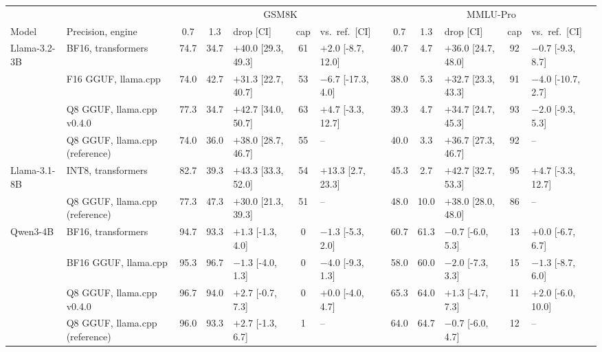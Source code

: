 \begin{tabular}{llcclclcclcl}
\toprule
 & & \multicolumn{5}{c}{GSM8K} & \multicolumn{5}{c}{MMLU-Pro} \\
Model & Precision, engine & 0.7 & 1.3 & drop [CI] & cap & vs.\ ref.\ [CI] & 0.7 & 1.3 & drop [CI] & cap & vs.\ ref.\ [CI] \\
\midrule
Llama-3.2-3B & BF16, transformers & 74.7 & 34.7 & $+40.0$ [29.3, 49.3] & 61 & $+2.0$ [-8.7, 12.0] & 40.7 & 4.7 & $+36.0$ [24.7, 48.0] & 92 & $-0.7$ [-9.3, 8.7] \\
 & F16 GGUF, llama.cpp & 74.0 & 42.7 & $+31.3$ [22.7, 40.7] & 53 & $-6.7$ [-17.3, 4.0] & 38.0 & 5.3 & $+32.7$ [23.3, 43.3] & 91 & $-4.0$ [-10.7, 2.7] \\
 & Q8 GGUF, llama.cpp v0.4.0 & 77.3 & 34.7 & $+42.7$ [34.0, 50.7] & 63 & $+4.7$ [-3.3, 12.7] & 39.3 & 4.7 & $+34.7$ [24.7, 45.3] & 93 & $-2.0$ [-9.3, 5.3] \\
 & Q8 GGUF, llama.cpp (reference) & 74.0 & 36.0 & $+38.0$ [28.7, 46.7] & 55 & -- & 40.0 & 3.3 & $+36.7$ [27.3, 46.7] & 92 & -- \\
\midrule
Llama-3.1-8B & INT8, transformers & 82.7 & 39.3 & $+43.3$ [33.3, 52.0] & 54 & $+13.3$ [2.7, 23.3] & 45.3 & 2.7 & $+42.7$ [32.7, 53.3] & 95 & $+4.7$ [-3.3, 12.7] \\
 & Q8 GGUF, llama.cpp (reference) & 77.3 & 47.3 & $+30.0$ [21.3, 39.3] & 51 & -- & 48.0 & 10.0 & $+38.0$ [28.0, 48.0] & 86 & -- \\
\midrule
Qwen3-4B & BF16, transformers & 94.7 & 93.3 & $+1.3$ [-1.3, 4.0] & 0 & $-1.3$ [-5.3, 2.0] & 60.7 & 61.3 & $-0.7$ [-6.0, 5.3] & 13 & $+0.0$ [-6.7, 6.7] \\
 & BF16 GGUF, llama.cpp & 95.3 & 96.7 & $-1.3$ [-4.0, 1.3] & 0 & $-4.0$ [-9.3, 1.3] & 58.0 & 60.0 & $-2.0$ [-7.3, 3.3] & 15 & $-1.3$ [-8.7, 6.0] \\
 & Q8 GGUF, llama.cpp v0.4.0 & 96.7 & 94.0 & $+2.7$ [-0.7, 7.3] & 0 & $+0.0$ [-4.0, 4.7] & 65.3 & 64.0 & $+1.3$ [-4.7, 7.3] & 11 & $+2.0$ [-6.0, 10.0] \\
 & Q8 GGUF, llama.cpp (reference) & 96.0 & 93.3 & $+2.7$ [-1.3, 6.7] & 1 & -- & 64.0 & 64.7 & $-0.7$ [-6.0, 4.7] & 12 & -- \\
\bottomrule
\end{tabular}

